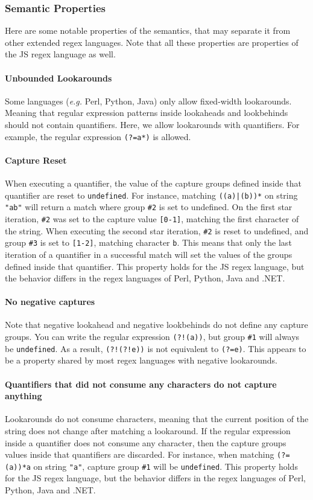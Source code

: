 \documentclass{article}
\def\regex#1{\texttt{#1}}
\def\undef{\texttt{undefined}}
\def\str#1{\texttt{"#1"}}
\def\group#1{\texttt{\##1}}
\begin{document}
\subsubsection{Semantic Properties}
Here are some notable properties of the semantics, that may separate it from other extended regex languages.
Note that all these properties are properties of the JS regex language as well.

\paragraph{Unbounded Lookarounds}
Some languages (\emph{e.g.} Perl, Python, Java) only allow fixed-width lookarounds. Meaning that regular expression patterns inside lookaheads and lookbehinds should not contain quantifiers.
Here, we allow lookarounds with quantifiers.
For example, the regular expression \regex{(?=a*)} is allowed.

\paragraph{Capture Reset}
When executing a quantifier, the value of the capture groups defined inside that quantifier are reset to \undef.
For instance, matching \regex{((a)|(b))*} on string \str{ab} will return a match where group \group{2} is set to undefined.
On the first star iteration, \group{2} was set to the capture value \texttt{[0-1]}, matching the first character of the string.
When executing the second star iteration, \group{2} is reset to undefined, and group \group{3} is set to \texttt{[1-2]}, matching character \texttt{b}.
This means that only the last iteration of a quantifier in a successful match will set the values of the groups defined inside that quantifier.
This property holds for the JS regex language, but the behavior differs in the regex languages of Perl, Python, Java and .NET.

\paragraph{No negative captures}
Note that negative lookahead and negative lookbehinds do not define any capture groups.
You can write the regular expression \regex{(?!(a))}, but group \group{1} will always be \undef.
As a result, \regex{(?!(?!e))} is not equivalent to \regex{(?=e)}.
This appears to be a property shared by most regex languages with negative lookarounds.

\paragraph{Quantifiers that did not consume any characters do not capture anything}
Lookarounds do not consume characters, meaning that the current position of the string does not change after matching a lookaround.
If the regular expression inside a quantifier does not consume any character, then the capture groups values inside that quantifiers are discarded.
For instance, when matching \regex{(?=(a))*a} on string \str{a}, capture group \group{1} will be \undef.
This property holds for the JS regex language, but the behavior differs in the regex languages of Perl, Python, Java and .NET.
\end{document}
